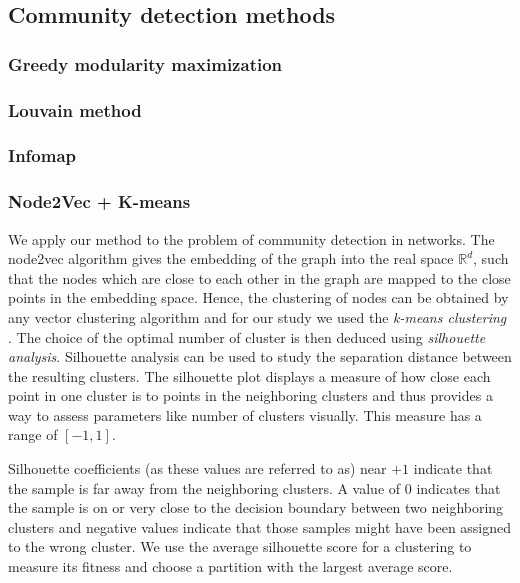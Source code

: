\subsection{Community detection methods}

\subsubsection{Greedy modularity maximization}
\subsubsection{Louvain method}
\subsubsection{Infomap}

\subsubsection{Node2Vec + K-means}
We apply our method to the problem of community detection in networks. The node2vec algorithm gives the embedding of the graph into the real space $\mathbb{R}^d$, such that the nodes which are close to each other in the graph are mapped to the close points in the embedding space. Hence, the clustering of nodes can be obtained by any vector clustering algorithm and for our study we used the \textit{k-means clustering} \cite{Macqueen1967}. The choice of the optimal number of cluster is then deduced using \textit{silhouette analysis}. Silhouette analysis can be used to study the separation distance between the resulting clusters. The silhouette plot displays a measure of how close each point in one cluster is to points in the neighboring clusters and thus provides a way to assess parameters like number of clusters visually. This measure has a range of $[-1, 1]$.

Silhouette coefficients (as these values are referred to as) near $+1$ indicate that the sample is far away from the neighboring clusters. A value of $0$ indicates that the sample is on or very close to the decision boundary between two neighboring clusters and negative values indicate that those samples might have been assigned to the wrong cluster. We use the average silhouette score for a clustering to measure its fitness and choose a partition with the largest average score. 

